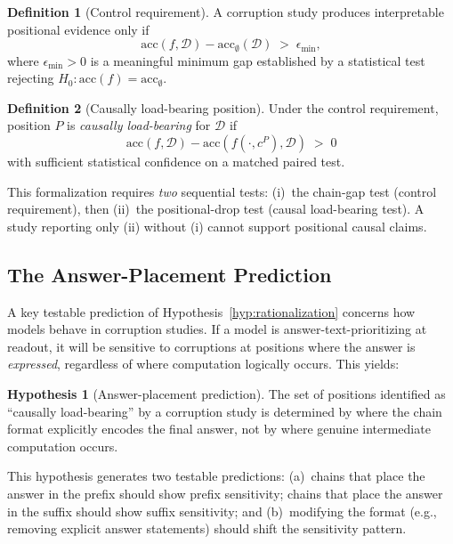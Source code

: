 \documentclass{article}
\theoremstyle{definition}
\newtheorem{definition}{Definition}
\theoremstyle{definition}
\newtheorem{hypothesis}{Hypothesis}
\begin{document}
\begin{definition}[Control requirement]
\label{def:2}
  A corruption study produces interpretable positional evidence only if
  \[
    \mathrm{acc}(f, \mathcal{D}) - \mathrm{acc}_\emptyset(\mathcal{D})
    \;>\; \epsilon_\mathrm{min},
  \]
  where $\epsilon_\mathrm{min} > 0$ is a meaningful minimum gap established
  by a statistical test rejecting
  $H_0\colon \mathrm{acc}(f) = \mathrm{acc}_\emptyset$.
\end{definition}

\begin{definition}[Causally load-bearing position]
  Under the control requirement, position $P$ is \emph{causally load-bearing}
  for $\mathcal{D}$ if
  \[
    \mathrm{acc}(f, \mathcal{D}) - \mathrm{acc}(f(\cdot, c^P), \mathcal{D})
    \;>\; 0
  \]
  with sufficient statistical confidence on a matched paired test.
\end{definition}

This formalization requires \emph{two} sequential tests: (i)~the chain-gap
test (control requirement), then (ii)~the positional-drop test (causal
load-bearing test). A study reporting only (ii) without (i) cannot support
positional causal claims.

\subsection{The Answer-Placement Prediction}

A key testable prediction of Hypothesis~\ref{hyp:rationalization} concerns
how models behave in corruption studies. If a model is answer-text-prioritizing
at readout, it will be sensitive to corruptions at positions where the
answer is \emph{expressed}, regardless of where computation logically occurs.
This yields:

\begin{hypothesis}[Answer-placement prediction]
\label{hyp:format}
    The set of positions identified as ``causally load-bearing'' by a
    corruption study is determined by where the chain format explicitly encodes
    the final answer, not by where genuine intermediate computation occurs.
\end{hypothesis}

This hypothesis generates two testable predictions: (a)~chains that
place the answer in the prefix should show prefix sensitivity;
chains that place the answer in the suffix should show suffix
sensitivity; and (b)~modifying the format (e.g., removing
explicit answer statements) should shift the sensitivity pattern.
\end{document}
